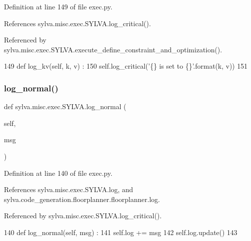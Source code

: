 Definition at line 149 of file exec.\+py.



References sylva.\+misc.\+exec.\+S\+Y\+L\+V\+A.\+log\+\_\+critical().



Referenced by sylva.\+misc.\+exec.\+S\+Y\+L\+V\+A.\+execute\+\_\+define\+\_\+constraint\+\_\+and\+\_\+optimization().


\begin{DoxyCode}
149   \textcolor{keyword}{def }log\_kv(self, k, v) :
150       self.log\_critical(\textcolor{stringliteral}{'\{\} is set to \{\}'}.format(k, v))
151 
\end{DoxyCode}
\mbox{\label{classsylva_1_1misc_1_1exec_1_1_s_y_l_v_a_a6aec517802adb215a4b47d9149f63944}} 
\subsubsection{\texorpdfstring{log\+\_\+normal()}{log\_normal()}}
{\footnotesize\ttfamily def sylva.\+misc.\+exec.\+S\+Y\+L\+V\+A.\+log\+\_\+normal (\begin{DoxyParamCaption}\item[{}]{self,  }\item[{}]{msg }\end{DoxyParamCaption})}



Definition at line 140 of file exec.\+py.



References sylva.\+misc.\+exec.\+S\+Y\+L\+V\+A.\+log, and sylva.\+code\+\_\+generation.\+floorplanner.\+floorplanner.\+log.



Referenced by sylva.\+misc.\+exec.\+S\+Y\+L\+V\+A.\+log\+\_\+critical().


\begin{DoxyCode}
140   \textcolor{keyword}{def }log\_normal(self, msg) :
141     self.log += msg
142     self.log.update()
143 
\end{DoxyCode}
\mbox{\label{classsylva_1_1misc_1_1exec_1_1_s_y_l_v_a_a689ffc2470814b85264167e77517c1e6}} 
